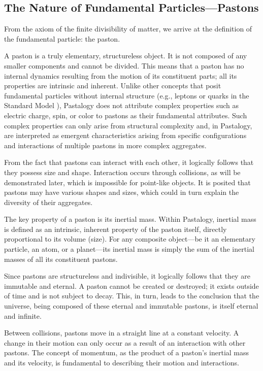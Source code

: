 \documentclass[pdflatex,sn-mathphys-num,referee]{sn-jnl}
\begin{document}
\subsection{The Nature of Fundamental Particles---Pastons}\label{subsec:pastons}

From the axiom of the finite divisibility of matter, we arrive at the definition of the fundamental particle: the paston.

A paston is a truly elementary, structureless object. It is not composed of any smaller components and cannot be divided. This means that a paston has no internal dynamics resulting from the motion of its constituent parts; all its properties are intrinsic and inherent. Unlike other concepts that posit fundamental particles without internal structure (e.g., leptons or quarks in the Standard Model \cite{pdg2024}), Pastalogy does not attribute complex properties such as electric charge, spin, or color to pastons as their fundamental attributes. Such complex properties can only arise from structural complexity and, in Pastalogy, are interpreted as emergent characteristics arising from specific configurations and interactions of multiple pastons in more complex aggregates.

From the fact that pastons can interact with each other, it logically follows that they possess size and shape. Interaction occurs through collisions, as will be demonstrated later, which is impossible for point-like objects. It is posited that pastons may have various shapes and sizes, which could in turn explain the diversity of their aggregates.

The key property of a paston is its inertial mass. Within Pastalogy, inertial mass is defined as an intrinsic, inherent property of the paston itself, directly proportional to its volume (size). For any composite object---be it an elementary particle, an atom, or a planet---its inertial mass is simply the sum of the inertial masses of all its constituent pastons.

Since pastons are structureless and indivisible, it logically follows that they are immutable and eternal. A paston cannot be created or destroyed; it exists outside of time and is not subject to decay. This, in turn, leads to the conclusion that the universe, being composed of these eternal and immutable pastons, is itself eternal and infinite.

Between collisions, pastons move in a straight line at a constant velocity. A change in their motion can only occur as a result of an interaction with other pastons. The concept of momentum, as the product of a paston's inertial mass and its velocity, is fundamental to describing their motion and interactions.
\end{document}
